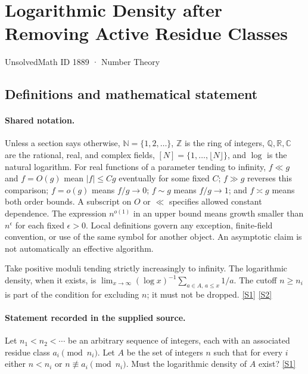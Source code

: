 \documentclass[11pt,a4paper]{article}
\newcommand{\N}{\mathbb{N}}
\newcommand{\Z}{\mathbb{Z}}
\newcommand{\Q}{\mathbb{Q}}
\newcommand{\R}{\mathbb{R}}
\newcommand{\C}{\mathbb{C}}
\newcommand{\sref}[2]{\hyperlink{source:#1:#2}{[S#2]}}
\begin{document}

\setcounter{section}{1888}

\section{Logarithmic Density after Removing Active Residue Classes}\label{1889}

{\small\sffamily UnsolvedMath ID 1889 · Number Theory}

\subsection{Definitions and mathematical statement}

\paragraph{Shared notation.}Unless a section says otherwise, $\N=\{1,2,\ldots\}$,
$\Z$ is the ring of integers, $\Q,\R,\C$ are the rational, real, and complex
fields, $[N]=\{1,\ldots,\lfloor N\rfloor\}$, and $\log$ is the natural
logarithm. For real functions of a parameter tending to infinity,
$f\ll g$ and $f=O(g)$ mean $|f|\leq Cg$ eventually for some fixed $C$;
$f\gg g$ reverses this comparison; $f=o(g)$ means $f/g\to0$;
$f\sim g$ means $f/g\to1$; and $f\asymp g$ means both order bounds.
A subscript on $O$ or $\ll$ specifies allowed constant dependence.
The expression $n^{o(1)}$ in an upper bound means growth smaller than
$n^\epsilon$ for each fixed $\epsilon>0$. Local definitions govern any
exception, finite-field convention, or use of the same symbol for another
object. An asymptotic claim is not automatically an effective algorithm.



Take positive moduli tending strictly increasingly to infinity. The logarithmic density, when it exists, is $\lim_{x\to\infty}(\log x)^{-1}\sum_{a\in A,\,a\leq x}1/a$. The cutoff $n\geq n_i$ is part of the condition for excluding $n$; it must not be dropped. \sref{1889}{1} \sref{1889}{2}

\paragraph{Statement recorded in the supplied source.}
Let $n_1<n_2<\cdots$ be an arbitrary sequence of integers, each with an associated residue class $a_i\pmod{n_i}$. Let $A$ be the set of integers $n$ such that for every $i$ either $n<n_i$ or $n\not\equiv a_i\pmod{n_i}$. Must the logarithmic density of $A$ exist? \sref{1889}{1}
\end{document}
